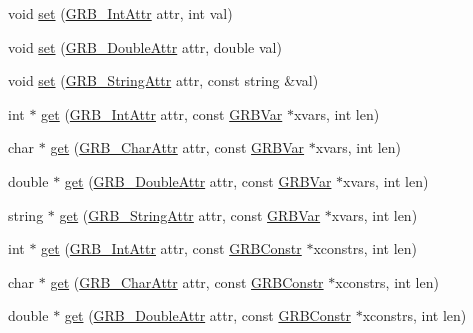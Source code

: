 \begin{DoxyCompactItemize}
\item 
void \hyperlink{classGRBModel_a8df5e3c25795f50163511d383a460b98}{set} (\hyperlink{gurobi__c_09_09_8h_acfc136f6822be3d3e36ac84bd76b0900}{G\+R\+B\+\_\+\+Int\+Attr} attr, int val)
\item 
void \hyperlink{classGRBModel_a42c9aad88b3d2afd75e0fe547c69cfeb}{set} (\hyperlink{gurobi__c_09_09_8h_a2f43cc28447ce1778973a1f7961e8180}{G\+R\+B\+\_\+\+Double\+Attr} attr, double val)
\item 
void \hyperlink{classGRBModel_af14524414b1b608e2dedc89d699ba090}{set} (\hyperlink{gurobi__c_09_09_8h_a08ffa110d9b1684d689ae53300bb7ec1}{G\+R\+B\+\_\+\+String\+Attr} attr, const string \&val)
\item 
int $\ast$ \hyperlink{classGRBModel_ad65bb0a90763bd68c29d62da6fcd6c06}{get} (\hyperlink{gurobi__c_09_09_8h_acfc136f6822be3d3e36ac84bd76b0900}{G\+R\+B\+\_\+\+Int\+Attr} attr, const \hyperlink{classGRBVar}{G\+R\+B\+Var} $\ast$xvars, int len)
\item 
char $\ast$ \hyperlink{classGRBModel_a6af098708900c06369dadb51d6d8d343}{get} (\hyperlink{gurobi__c_09_09_8h_a590e6aa44289cb0563eb6a382794dace}{G\+R\+B\+\_\+\+Char\+Attr} attr, const \hyperlink{classGRBVar}{G\+R\+B\+Var} $\ast$xvars, int len)
\item 
double $\ast$ \hyperlink{classGRBModel_ac82e98ad043965288391dfc8a65f0b5d}{get} (\hyperlink{gurobi__c_09_09_8h_a2f43cc28447ce1778973a1f7961e8180}{G\+R\+B\+\_\+\+Double\+Attr} attr, const \hyperlink{classGRBVar}{G\+R\+B\+Var} $\ast$xvars, int len)
\item 
string $\ast$ \hyperlink{classGRBModel_a8a32496eb7dd5ff5b0cd4483f29bd37a}{get} (\hyperlink{gurobi__c_09_09_8h_a08ffa110d9b1684d689ae53300bb7ec1}{G\+R\+B\+\_\+\+String\+Attr} attr, const \hyperlink{classGRBVar}{G\+R\+B\+Var} $\ast$xvars, int len)
\item 
int $\ast$ \hyperlink{classGRBModel_ac78d23b5a697701a5195ae6247e4fa89}{get} (\hyperlink{gurobi__c_09_09_8h_acfc136f6822be3d3e36ac84bd76b0900}{G\+R\+B\+\_\+\+Int\+Attr} attr, const \hyperlink{classGRBConstr}{G\+R\+B\+Constr} $\ast$xconstrs, int len)
\item 
char $\ast$ \hyperlink{classGRBModel_a27cf7cac2d485a0addffaab547194e97}{get} (\hyperlink{gurobi__c_09_09_8h_a590e6aa44289cb0563eb6a382794dace}{G\+R\+B\+\_\+\+Char\+Attr} attr, const \hyperlink{classGRBConstr}{G\+R\+B\+Constr} $\ast$xconstrs, int len)
\item 
double $\ast$ \hyperlink{classGRBModel_af6b4bfca41c2a82541b770e69377902f}{get} (\hyperlink{gurobi__c_09_09_8h_a2f43cc28447ce1778973a1f7961e8180}{G\+R\+B\+\_\+\+Double\+Attr} attr, const \hyperlink{classGRBConstr}{G\+R\+B\+Constr} $\ast$xconstrs, int len)

\end{DoxyCompactItemize}
